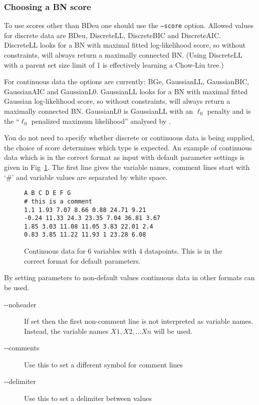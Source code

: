 \documentclass{article}
\begin{document}
\subsubsection{Choosing a BN score}
\label{sec:scores}

To use scores other than BDeu one should use the \texttt{--score}
option. Allowed values for discrete data are BDeu, DiscreteLL,
DiscreteBIC and DiscreteAIC. DiscreteLL looks for a BN with maximal
fitted log-likelihood score, so without constraints, will always
return a maximally connected BN. (Using DiscreteLL with a parent set
size limit of 1 is effectively learning a Chow-Liu tree.)

For continuous data the options are currently: BGe, GaussianLL,
GaussianBIC, GaussianAIC and GaussianL0. GaussianLL looks for a BN
with maximal fitted Gaussian log-likelihood score, so without
constraints, will always return a maximally connected BN. GaussianL0
is GaussianLL with an $\ell_{0}$ penalty and is the ``$\ell_{0}$
penalized maximum likelihood'' analysed by
\citet{geer13:_penal_maxim_likel_for_spars}.

You do not need to specify whether discrete or continuous data is
being supplied, the choice of score determines which type is expected.
An example of continuous data which is in the correct format as input
with default parameter settings is given in
Fig~\ref{fig:continuousdat}. The first line gives the variable names,
comment lines start with `\#' and variable values are separated by
white space.

\begin{figure}
  \centering
\begin{verbatim}
A B C D E F G
# this is a comment
1.1 1.93 7.07 8.66 0.88 24.71 9.21
-0.24 11.33 24.3 23.35 7.04 36.81 3.67
1.85 3.03 11.08 11.05 3.83 22.01 2.4
0.83 3.85 11.22 11.93 1 23.28 6.08
\end{verbatim}
  \caption{Continuous data for 6 variables with 4 datapoints. This is in
  the correct format for default parameters.}
  \label{fig:continuousdat}
\end{figure}

By setting parameters to non-default values continuous data in other
formats can be used.
\begin{description}
\item[-{}-noheader] If set then the first non-comment line is not
  interpreted as variable names. Instead, the variable names $X1, X2,
  \dots Xn$ will be used.
\item[-{}-comments] Use this to set a different symbol for comment lines
\item[-{}-delimiter] Use this to set a delimiter between values
\end{description}
\end{document}
